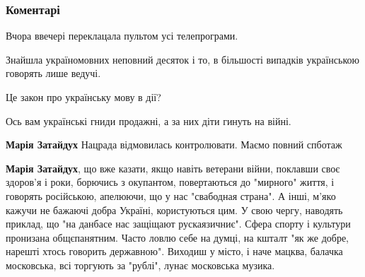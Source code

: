  
 
 
 
 
\subsubsection{Коментарі}

\begin{itemize}
 
Вчора ввечері переклацала пультом усі телепрограми.

Знайшла україномовних неповний десяток і то, в більшості випадків українською
говорять лише ведучі.

Це закон про українську мову в дії?

Ось вам українські гниди продажні, а за них діти гинуть на війні.

\begin{itemize}
 
\textbf{Марія Затайдух} Нацрада відмовилась контролювати. Маємо повний спботаж

 
\textbf{Марія Затайдух}, що вже казати, якщо навіть ветерани війни, поклавши
своє здоров'я і роки, борючись з окупантом, повертаються до "мирного" життя, і
говорять російською, апелюючи, що у нас "свабодная страна". А інші, м'яко
кажучи не бажаючі добра Україні, користуються цим. У свою чергу, наводять
приклад, що "на данбасе нас защіщают рускаязичниє". Сфера спорту і культури
пронизана общєпанятним.  Часто ловлю себе на думці, на кшталт "як же добре,
нарешті хтось говорить державною". Виходиш у місто, і наче мацква, балачка
московська, всі торгують за "рублі", лунає московська музика.


\end{itemize}
\end{itemize}

